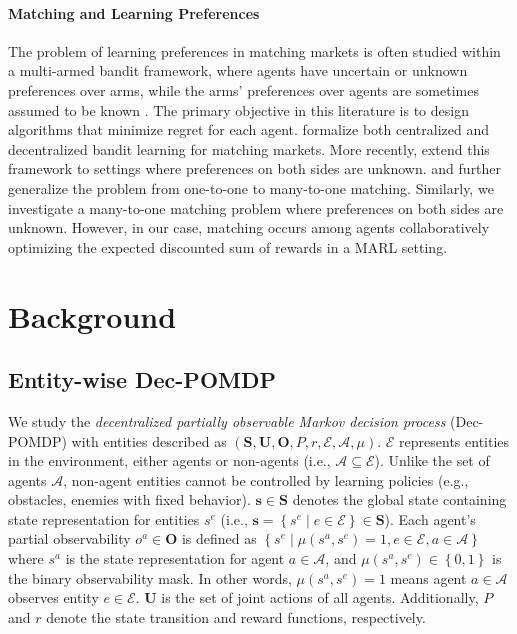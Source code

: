 \documentclass[10pt]{article} %
\begin{document}
\paragraph{Matching and Learning Preferences}
The problem of learning preferences in matching markets is often studied within a multi-armed bandit framework, where agents have uncertain \citep{aziz2020stable} or unknown preferences over arms, while the arms' preferences over agents are sometimes assumed to be known  \citep{liu2020competing,hosseini2024putting}. The primary objective in this literature is to design algorithms that minimize regret for each agent. \citet{liu2020competing} formalize both centralized and decentralized bandit learning for matching markets. More recently, \citet{zhangdecentralized} extend this framework to settings where preferences on both sides are unknown. \citet{wang2022bandit} and \citet{kong2024improved} further generalize the problem from one-to-one to many-to-one matching. Similarly, we investigate a many-to-one matching problem where preferences on both sides are unknown. However, in our case, matching occurs among agents collaboratively optimizing the expected discounted sum of rewards in a MARL setting.

\section{Background}
\label{apndx:team_formation_background}
\subsection{Entity-wise Dec-POMDP}

We study the \textit{decentralized partially observable Markov decision process} (Dec-POMDP) \citep{oliehoek2016concise} with entities \citep{schroeder2019multi} described as $
(\mathbf{S}, \mathbf{U}, \mathbf{O}, P, r, \mathcal{E}, \mathcal{A}, \mu)$. $\mathcal{E}$ represents entities in the environment, either agents or non-agents (i.e., $\mathcal{A} \subseteq \mathcal{E}$). Unlike the set of agents $\mathcal{A}$, non-agent entities cannot be controlled by learning policies (e.g., obstacles, enemies with fixed behavior). $\mathbf{s} \in \mathbf{S}$ denotes the global state containing state representation for entities $s^e$ (i.e., $\mathbf{s} = \left\{s^e \mid e \in \mathcal{E}\right\} \in \mathbf{S}$). Each agent's partial observability $o^a \in \mathbf{O}$ is defined as $\left\{s^e \mid \mu\left(s^a, s^e\right)=1, e \in \mathcal{E}, a \in \mathcal{A} \right\}$ where $s^a$ is the state representation for agent $a \in \mathcal{A}$, and $\mu\left(s^a, s^e\right) \in \left\{ 0,1 \right\}$ is the binary observability mask. In other words,  $\mu\left(s^a, s^e\right)=1$ means agent $a \in \mathcal{A}$ observes entity $e \in \mathcal{E}$. $\mathbf{U}$ is the set of joint actions of all agents. Additionally, $P$ and $r$ denote the state transition and reward functions, respectively.
\end{document}
